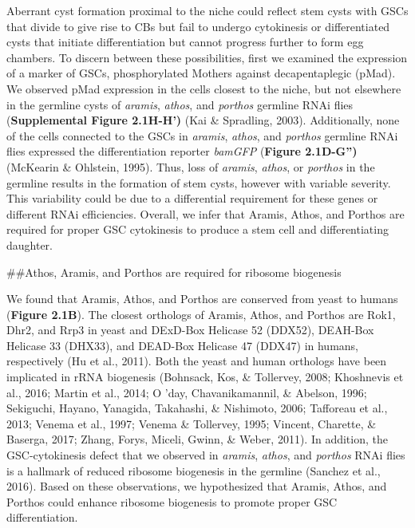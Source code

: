 \documentclass[12pt,twoside]{reedthesis}
\begin{document}
Aberrant cyst formation proximal to the niche could reflect stem cysts
with GSCs that divide to give rise to CBs but fail to undergo
cytokinesis or differentiated cysts that initiate differentiation but
cannot progress further to form egg chambers. To discern between these
possibilities, first we examined the expression of a marker of GSCs,
phosphorylated Mothers against decapentaplegic (pMad). We observed pMad
expression in the cells closest to the niche, but not elsewhere in the
germline cysts of \emph{aramis}, \emph{athos}, and \emph{porthos} germline RNAi flies
(\textbf{Supplemental Figure 2.1H-H')} (Kai \& Spradling, 2003). Additionally, none
of the cells connected to the GSCs in \emph{aramis}, \emph{athos}, and \emph{porthos}
germline RNAi flies expressed the differentiation reporter \emph{bamGFP}
(\textbf{Figure 2.1D-G'')} (McKearin \& Ohlstein, 1995). Thus, loss of \emph{aramis},
\emph{athos}, or \emph{porthos} in the germline results in the formation of stem
cysts, however with variable severity. This variability could be due to
a differential requirement for these genes or different RNAi
efficiencies. Overall, we infer that Aramis, Athos, and Porthos are
required for proper GSC cytokinesis to produce a stem cell and
differentiating daughter.

\#\#Athos, Aramis, and Porthos are required for ribosome biogenesis

We found that Aramis, Athos, and Porthos are conserved from yeast to
humans (\textbf{Figure 2.1B}). The closest orthologs of Aramis, Athos, and
Porthos are Rok1, Dhr2, and Rrp3 in yeast and DExD-Box Helicase 52
(DDX52), DEAH-Box Helicase 33 (DHX33), and DEAD-Box Helicase 47 (DDX47)
in humans, respectively (Hu et al., 2011). Both
the yeast and human orthologs have been implicated in rRNA biogenesis
(Bohnsack, Kos, \& Tollervey, 2008; Khoshnevis et al., 2016; Martin et al., 2014; O 'day, Chavanikamannil, \& Abelson, 1996; Sekiguchi, Hayano, Yanagida, Takahashi, \& Nishimoto, 2006; Tafforeau et al., 2013; Venema et al., 1997; Venema \& Tollervey, 1995; Vincent, Charette, \& Baserga, 2017; Zhang, Forys, Miceli, Gwinn, \& Weber, 2011). In addition, the
GSC-cytokinesis defect that we observed in \emph{aramis}, \emph{athos}, and
\emph{porthos} RNAi flies is a hallmark of reduced ribosome biogenesis in the
germline (Sanchez et al., 2016). Based on these observations, we
hypothesized that Aramis, Athos, and Porthos could enhance ribosome
biogenesis to promote proper GSC differentiation.
\end{document}
